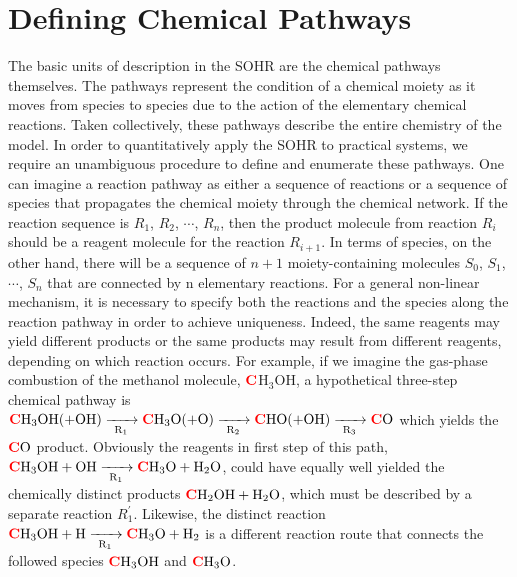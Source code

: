 \section{Defining Chemical Pathways}
\label{ch2:def_path}
The basic units of description in the SOHR are the chemical pathways themselves. The
pathways represent the condition of a chemical moiety as it moves from species to species
due to the action of the elementary chemical reactions. Taken collectively, these
pathways describe the entire chemistry of the model. In order to quantitatively apply
the SOHR to practical systems, we require an unambiguous procedure to define and
enumerate these pathways. One can imagine a reaction pathway as either a sequence of reactions or a sequence of species that propagates the chemical moiety through the
chemical network. If the reaction sequence is $R_1$, $R_2$, $\cdots$, $R_n$, then the product molecule
from reaction $R_i$ should be a reagent molecule for the reaction $R_{i+1}$. In terms of species,
on the other hand, there will be a sequence of $n + 1$ moiety-containing molecules $S_0$,
$S_1$, $\cdots$, $S_n$ that are connected by n elementary reactions. For a general non-linear mechanism,
it is necessary to specify both the reactions and the species along the reaction
pathway in order to achieve uniqueness. Indeed, the same reagents may yield different
products or the same products may result from different reagents, depending on which
reaction occurs. For example, if we imagine the gas-phase combustion of the methanol
molecule, $\textcolor{red}{\textbf{C}}$H$_3$OH, a hypothetical three-step chemical pathway is $\textcolor{red}{\textbf{C}}\text{H}_3\text{OH}(+\text{OH}) \xrightarrow[\text{R}_{1}]{\makebox[0.6cm]{}} \textcolor{red}{\textbf{C}}\text{H}_3\text{O} (+\text{O})  \xrightarrow[\text{R}_{2}]{\makebox[0.6cm]{}} \textcolor{red}{\textbf{C}}\text{HO} (+\text{OH}) \xrightarrow[\text{R}_{3}]{\makebox[0.6cm]{}} \textcolor{red}{\textbf{C}}\text{O}$ which yields the $\textcolor{red}{\textbf{C}}\text{O}$ product. Obviously the reagents in first step of this path, $\textcolor{red}{\textbf{C}}\text{H}_3\text{OH}+\text{OH} \xrightarrow[\text{R}_{1}]{\makebox[0.6cm]{}} \textcolor{red}{\textbf{C}}\text{H}_3\text{O} + \text{H}_2\text{O}$, could have equally well yielded the chemically distinct products $\textcolor{red}{\textbf{C}}\text{H}_2\text{OH} + \text{H}_2\text{O}$, which must be described by a separate
reaction $R_1^{\prime}$. Likewise, the distinct reaction $\textcolor{red}{\textbf{C}}\text{H}_3\text{OH}+\text{H} \xrightarrow[\text{R}_{1}]{\makebox[0.6cm]{}} \textcolor{red}{\textbf{C}}\text{H}_3\text{O} + \text{H}_2$ is a different reaction route that connects the followed species $\textcolor{red}{\textbf{C}}\text{H}_3\text{OH}$ and $\textcolor{red}{\textbf{C}}\text{H}_3\text{O}$.
\newline

